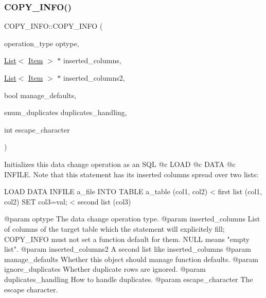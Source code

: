 \subsubsection{\texorpdfstring{C\+O\+P\+Y\+\_\+\+I\+N\+F\+O()}{COPY\_INFO()}\hspace{0.1cm}{\footnotesize\ttfamily [2/3]}}
{\footnotesize\ttfamily C\+O\+P\+Y\+\_\+\+I\+N\+F\+O\+::\+C\+O\+P\+Y\+\_\+\+I\+N\+FO (\begin{DoxyParamCaption}\item[{operation\+\_\+type}]{optype,  }\item[{\mbox{\hyperlink{classList}{List}}$<$ \mbox{\hyperlink{classItem}{Item}} $>$ $\ast$}]{inserted\+\_\+columns,  }\item[{\mbox{\hyperlink{classList}{List}}$<$ \mbox{\hyperlink{classItem}{Item}} $>$ $\ast$}]{inserted\+\_\+columns2,  }\item[{bool}]{manage\+\_\+defaults,  }\item[{enum\+\_\+duplicates}]{duplicates\+\_\+handling,  }\item[{int}]{escape\+\_\+character }\end{DoxyParamCaption})\hspace{0.3cm}{\ttfamily [inline]}}

\begin{DoxyVerb} Initializes this data change operation as an SQL @c LOAD @c DATA @c
 INFILE.
 Note that this statement has its inserted columns spread over two
 lists:
\end{DoxyVerb}
 \begin{DoxyVerb}     LOAD DATA INFILE a_file
     INTO TABLE a_table (col1, col2)   < first list (col1, col2)
     SET col3=val;                     < second list (col3)
\end{DoxyVerb}
 \begin{DoxyVerb} @param optype            The data change operation type.
 @param inserted_columns List of columns of the target table which
                         the statement will explicitely fill; COPY_INFO
                         must not set a function default for them. NULL
                         means "empty list".
 @param inserted_columns2 A second list like inserted_columns
 @param manage_defaults   Whether this object should manage function
                          defaults.
 @param ignore_duplicates   Whether duplicate rows are ignored.
 @param duplicates_handling How to handle duplicates.
 @param escape_character    The escape character.
\end{DoxyVerb}
 \mbox{\label{classCOPY__INFO_a6f301b4e25739036b3acd99a24c54257}} 

